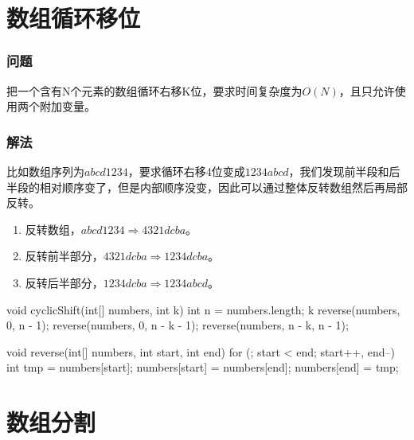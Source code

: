 \section{数组循环移位} %
\label{sec:array-cyclic-shift}

\subsubsection{问题}
把一个含有N个元素的数组循环右移K位，要求时间复杂度为$O(N)$，且只允许使用两个附加变量。

\subsubsection{解法}
比如数组序列为$abcd1234$，要求循环右移4位变成$1234abcd$，我们发现前半段和后半段的相对顺序变了，但是内部顺序没变，因此可以通过整体反转数组然后再局部反转。
\begin{enumerate}
	\item 反转数组，$abcd1234 \Longrightarrow 4321dcba$。
	\item 反转前半部分，$4321dcba \Longrightarrow 1234dcba$。
	\item 反转后半部分，$1234dcba \Longrightarrow 1234abcd$。
\end{enumerate}

\begin{Codex}[label={[$O(n)+O(1)$]Chap02_17_ArrayCyclicShift.java}]
void cyclicShift(int[] numbers, int k) {
    int n = numbers.length;
    k %
    reverse(numbers, 0, n - 1);
    reverse(numbers, 0, n - k - 1);
    reverse(numbers, n - k, n - 1);
}

void reverse(int[] numbers, int start, int end) {
    for (; start < end; start++, end--) {
        int tmp = numbers[start];
        numbers[start] = numbers[end];
        numbers[end] = tmp;
    }
}
\end{Codex}


\section{数组分割} %
\label{sec:split-array}

